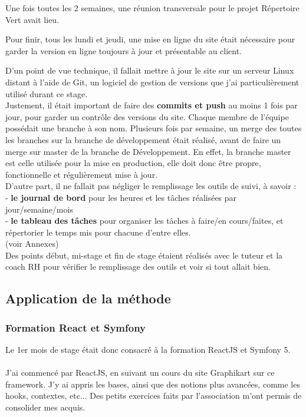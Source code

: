 Une fois toutes les 2 semaines, une réunion transversale pour le projet Répertoire Vert avait lieu.

Pour finir, tous les lundi et jeudi, une mise en ligne du site était nécessaire pour garder la version en ligne toujours à jour et présentable au client.

D'un point de vue technique, il fallait mettre à jour le site sur un serveur Linux distant à l'aide de Git, un logiciel de gestion de versions que j'ai particulièrement utilisé durant ce stage. \\

Justement, il était important de faire des \textbf{commits et push} au moins 1 fois par jour, pour garder un contrôle des versions du site.
Chaque membre de l'équipe possédait une branche à son nom. Plusieurs fois par semaine, un merge des toutes les branches sur la branche de développement était réalisé, avant de faire un merge sur master de la branche de Développement.
En effet, la branche master est celle utilisée pour la mise en production, elle doit donc être propre, fonctionnelle et régulièrement mise à jour. \\

D'autre part, il ne fallait pas négliger le remplissage les outils de suivi, à savoir : \\
- \textbf{le journal de bord} pour les heures et les tâches réalisées par jour/semaine/mois\\ 
- \textbf{le tableau des tâches} pour organiser les tâches à faire/en cours/faites, et répertorier le temps mis pour chacune d'entre elles.\\
(voir Annexes)\\

Des points début, mi-stage et fin de stage étaient réalisés avec le tuteur et la coach RH pour vérifier le remplissage des outils et voir si tout allait bien.

\pagebreak
\subsection{Application de la méthode}

\subsubsection{Formation React et Symfony}

Le 1er mois de stage était donc consacré à la formation ReactJS et Symfony 5.\\\\
J'ai commencé par ReactJS, en suivant un cours du site Graphikart sur ce framework. 
J'y ai appris les bases, ainsi que des notions plus avancées, comme les hooks, contextes, etc...
Des petits exercices faits par l'association m'ont permis de consolider mes acquis.\\\\

